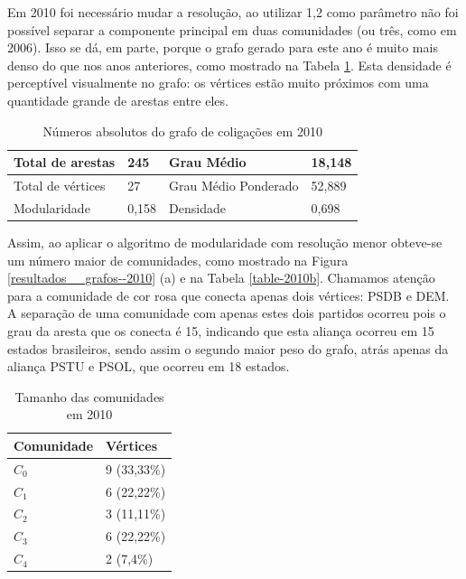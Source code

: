 Em 2010 foi necessário mudar a resolução, ao utilizar 1,2 como parâmetro não foi possível separar a componente principal em duas comunidades (ou três, como em 2006). Isso se dá, em parte, porque o grafo gerado para este ano é muito mais denso do que nos anos anteriores, como mostrado na Tabela \ref{table-2010a}. Esta densidade é perceptível visualmente no grafo: os vértices estão muito próximos com uma quantidade grande de arestas entre eles. 

\begin{table}[H]
\centering
\label{table-2010a}
\begin{tabular}{|l|l|l|l|}
\hline
Total de arestas  & 245 & Grau Médio           & 18,148 \\ \hline
Total de vértices & 27 & Grau Médio Ponderado & 52,889 \\ \hline
Modularidade      & 0,158 & Densidade            & 0,698 \\ \hline
\end{tabular}
\caption{Números absolutos do grafo de coligações em 2010}
\end{table}

Assim, ao aplicar o algoritmo de modularidade com resolução menor obteve-se um número maior de comunidades, como mostrado na Figura \ref{resultados__grafos--2010} (a) e na Tabela \ref{table-2010b}. Chamamos atenção para a comunidade de cor rosa que conecta apenas dois vértices: \gls{PSDB} e \gls{DEM}. A separação de uma comunidade com apenas estes dois partidos ocorreu pois o grau da aresta que os conecta é 15, indicando que esta aliança ocorreu em 15 estados brasileiros, sendo assim o segundo maior peso do grafo, atrás apenas da aliança \gls{PSTU} e \gls{PSOL}, que ocorreu em 18 estados.

\begin{table}[H]
\centering
\label{table-2014a}
\begin{tabular}{|l|l|}
\hline
Comunidade & Vértices \\ \hline
$C_0$         &     9 (33,33\%)                \\ \hline
$C_1$         &     6 (22,22\%)                \\ \hline
$C_2$         &       3 (11,11\%)               \\ \hline
$C_3$         &       6 (22,22\%)               \\ \hline
$C_4$         &       2 (7,4\%)               \\ \hline
\end{tabular}
\caption{Tamanho das comunidades em 2010}
\end{table}

